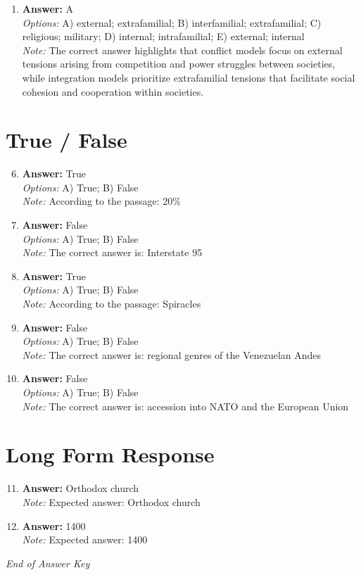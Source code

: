 \documentclass[12pt]{article}
\begin{document}
\begin{enumerate}[label=\arabic*.]
\item \textbf{Answer:} A
\\ \textit{Options:} A) external; extrafamilial; B) interfamilial; extrafamilial; C) religious; military; D) internal; intrafamilial; E) external; internal
\\ \textit{Note:} The correct answer highlights that conflict models focus on external tensions arising from competition and power struggles between societies, while integration models prioritize extrafamilial tensions that facilitate social cohesion and cooperation within societies.
\end{enumerate}

\section*{True / False}
\begin{enumerate}[label=\arabic*.]
\setcounter{enumi}{5}
\item \textbf{Answer:} True
\\ \textit{Options:} A) True; B) False
\\ \textit{Note:} According to the passage: 20\%
\item \textbf{Answer:} False
\\ \textit{Options:} A) True; B) False
\\ \textit{Note:} The correct answer is: Interstate 95
\item \textbf{Answer:} True
\\ \textit{Options:} A) True; B) False
\\ \textit{Note:} According to the passage: Spiracles
\item \textbf{Answer:} False
\\ \textit{Options:} A) True; B) False
\\ \textit{Note:} The correct answer is: regional genres of the Venezuelan Andes
\item \textbf{Answer:} False
\\ \textit{Options:} A) True; B) False
\\ \textit{Note:} The correct answer is: accession into NATO and the European Union
\end{enumerate}

\section*{Long Form Response}
\begin{enumerate}[label=\arabic*.]
\setcounter{enumi}{10}
\item \textbf{Answer:} Orthodox church
\\ \textit{Note:} Expected answer: Orthodox church
\item \textbf{Answer:} 1400
\\ \textit{Note:} Expected answer: 1400
\end{enumerate}

\vfill
\noindent\textit{End of Answer Key}
\end{document}
